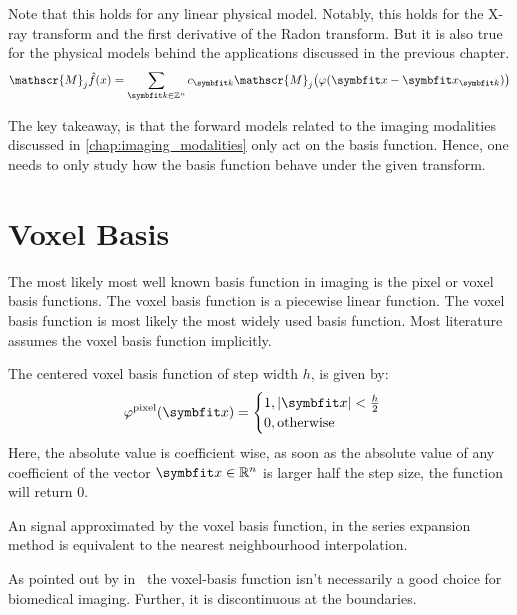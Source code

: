 Note that this holds for any linear physical model. Notably, this holds for the X-ray transform and
the first derivative of the Radon transform. But it is also true for the physical models behind the
applications discussed in the previous chapter.
\[ \mathscr{M}_j\near{f}(x) = \sum_{\mvec{k} \in \mathbb{Z}^n} c_{\mvec{k}}\mathscr{M}_j\left( \varphi(\mvec{x} - \mvec{x}_{\mvec{k}}) \right) \]

The key takeaway, is that the forward models related to the imaging modalities discussed in
\autoref{chap:imaging_modalities} only act on the basis function. Hence, one needs to only study how
the basis function behave under the given transform.

\section{Voxel Basis}\label{sec:voxel_basis}

The most likely most well known basis function in imaging is the pixel or voxel basis functions. The
voxel basis function is a piecewise linear function. The voxel basis function is most likely the
most widely used basis function. Most literature assumes the voxel basis function implicitly.

The centered voxel basis function of step width \(h\), is given by:
\begin{equation}\label{eq:voxel_basis_fn}
	\varphi^{\text{pixel}}(\mvec{x}) =
	\begin{cases}
		1, \abs{\mvec{x}} < \frac{h}{2} \\
		0, \text{otherwise}
	\end{cases}
\end{equation}
Here, the absolute value is coefficient wise, as soon as the absolute value of any coefficient of
the vector \(\mvec{x} \in \mathbb{R}^n\) is larger half the step size, the function will return
\(0\).


An signal approximated by the voxel basis function, in the series expansion method is equivalent to
the nearest neighbourhood interpolation.

As pointed out by \citeauthor*{lewitt_multidimensional_1990}
in~\cite{lewitt_multidimensional_1990,lewitt_alternatives_1992} the voxel-basis function isn't
necessarily a good choice for biomedical imaging. Further, it is discontinuous at the boundaries.

